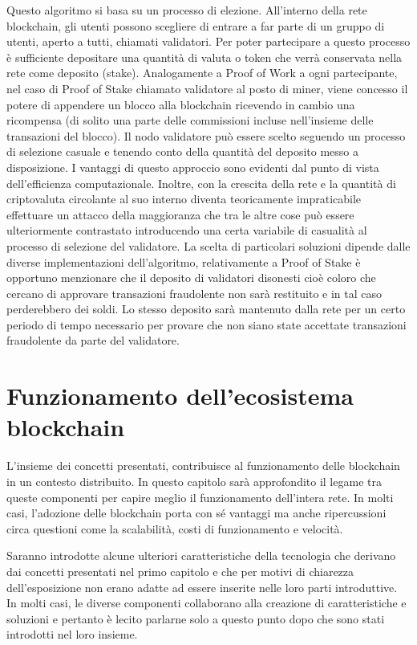 Questo algoritmo si basa su un processo di elezione. All’interno della rete blockchain, gli utenti possono scegliere di entrare a far parte di un gruppo di utenti, aperto a tutti, chiamati validatori. Per poter partecipare a questo processo è sufficiente depositare una quantità di valuta o token che verrà conservata nella rete come deposito (stake). Analogamente a Proof of Work a ogni partecipante, nel caso di Proof of Stake chiamato validatore al posto di miner, viene concesso il potere di appendere un blocco alla blockchain ricevendo in cambio una ricompensa (di solito una parte delle commissioni incluse nell’insieme delle transazioni del blocco). Il nodo validatore può essere scelto seguendo un processo di selezione casuale e tenendo conto della quantità del deposito messo a disposizione. I vantaggi di questo approccio sono evidenti dal punto di vista dell’efficienza computazionale. Inoltre, con la crescita della rete e la quantità di criptovaluta circolante al suo interno diventa teoricamente impraticabile effettuare un attacco della maggioranza che tra le altre cose può essere ulteriormente contrastato introducendo una certa variabile di casualità al processo di selezione del validatore. La scelta di particolari soluzioni dipende dalle diverse implementazioni dell'algoritmo, relativamente a Proof of Stake è opportuno menzionare che il deposito di validatori disonesti cioè coloro che cercano di approvare transazioni fraudolente non sarà restituito e in tal caso perderebbero dei soldi. Lo stesso deposito sarà mantenuto dalla rete per un certo periodo di tempo necessario per provare che non siano state accettate transazioni fraudolente da parte del validatore.


\section{Funzionamento dell'ecosistema blockchain} %

L’insieme dei concetti presentati, contribuisce al funzionamento delle blockchain in un contesto distribuito. In questo capitolo sarà approfondito il legame tra queste componenti per capire meglio il funzionamento dell’intera rete. In molti casi, l’adozione delle blockchain porta con sé vantaggi ma anche ripercussioni circa questioni come la scalabilità, costi di funzionamento e velocità.

Saranno introdotte alcune ulteriori caratteristiche della tecnologia che derivano dai concetti presentati nel primo capitolo e che per motivi di chiarezza dell’esposizione non erano adatte ad essere inserite nelle loro parti introduttive. In molti casi, le diverse componenti collaborano alla creazione di caratteristiche e soluzioni e pertanto è lecito parlarne solo a questo punto dopo che sono stati introdotti nel loro insieme.


